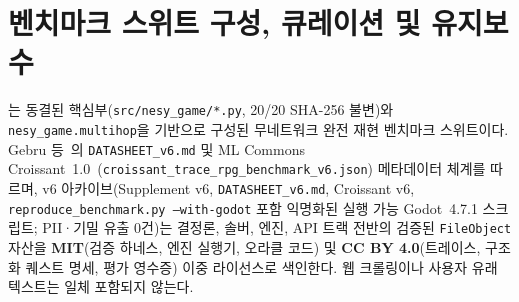 \section{벤치마크 스위트 구성, 큐레이션 및 유지보수}\label{sec:db-composition}
\system{}는 동결된 핵심부(\texttt{src/nesy\_game/*.py}, 20/20 SHA-256 불변)와 \texttt{nesy\_game.multihop}을 기반으로 구성된 무네트워크 완전 재현 벤치마크 스위트이다. Gebru 등~\cite{gebru2021datasheets}의 \texttt{DATASHEET\_v6.md} 및 ML Commons Croissant~1.0~\cite{akhtar2024croissant}(\texttt{croissant\_trace\_rpg\_benchmark\_v6.json}) 메타데이터 체계를 따르며, v6 아카이브(Supplement v6, \texttt{DATASHEET\_v6.md}, Croissant v6, \texttt{reproduce\_benchmark.py --with-godot} 포함 익명화된 실행 가능 Godot~4.7.1 스크립트; PII·기밀 유출 0건)는 결정론, 솔버, 엔진, API 트랙 전반의 검증된 \texttt{FileObject} 자산을 \textbf{MIT}(검증 하네스, 엔진 실행기, 오라클 코드) 및 \textbf{CC BY 4.0}(트레이스, 구조화 퀘스트 명세, 평가 영수증) 이중 라이선스로 색인한다. 웹 크롤링이나 사용자 유래 텍스트는 일체 포함되지 않는다.


